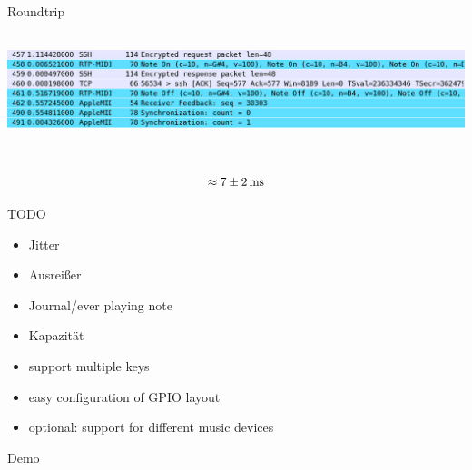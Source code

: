\begin{frame}{Roundtrip}
	\includegraphics[height=4cm]{img/wire.jpg}
	
	\[\approx 7\pm2\text{\,ms}\]
	
\end{frame}

\begin{frame}{TODO}
	\begin{itemize}
		\item Jitter
		\item Ausreißer
		\item Journal/ever playing note
		\item Kapazität
		\item support multiple keys
		\item easy configuration of GPIO layout
		\item optional: support for different music devices
	\end{itemize}
\end{frame}

\begin{frame}
	\centering
	\Huge Demo
\end{frame}
